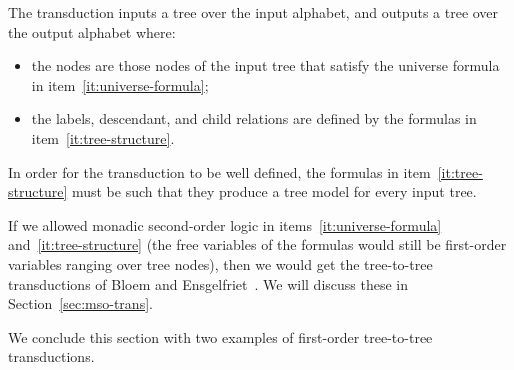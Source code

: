\begin{definition}
\begin{enumerate}
    The transduction inputs a tree over the input alphabet, and outputs a tree over the output alphabet where:
    \begin{itemize}
        \item the nodes  are those nodes of the input tree that satisfy the universe formula in item~\ref{it:universe-formula};
        \item the labels, descendant, and child relations are defined by the formulas in item~\ref{it:tree-structure}.
    \end{itemize}
    In order for the transduction to be well defined, the formulas in item~\ref{it:tree-structure} must be such that they produce a tree model for every input tree.
 \end{enumerate}
\end{definition}

If we allowed  monadic second-order logic \mso  in items~\ref{it:universe-formula} and~\ref {it:tree-structure} (the free variables of the formulas would  still be first-order variables ranging over tree nodes), then we would get the \mso tree-to-tree transductions of Bloem and Ensgelfriet~\cite[Section 3]{bloem_comparison_2000}. We will discuss these in  Section~\ref{sec:mso-trans}.


We conclude this section with two examples of first-order tree-to-tree transductions. 

